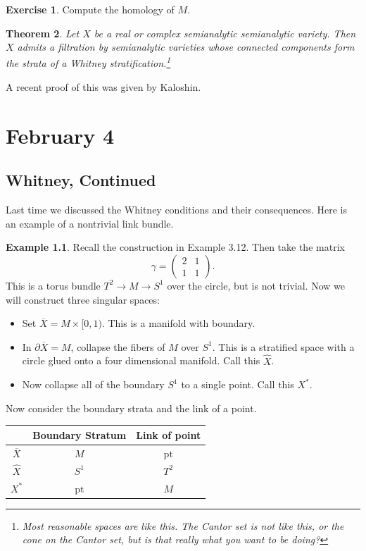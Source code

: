 \documentclass[leqno, openany]{memoir}
\newtheorem{thm}{Theorem}[chapter]
\theoremstyle{definition}
\newtheorem{exm}[thm]{Example}
\newtheorem{exer}[thm]{Exercise}
\theoremstyle{remark}
\theoremstyle{plain}
\theoremstyle{definition}
\theoremstyle{remark}
\newcommand{\mr}[1]{\mathrm{#1}}
\begin{document}
\begin{exer} Compute the homology of $M$.  \end{exer}

\begin{thm} Let $X$ be a real or complex semianalytic semianalytic variety.
    Then $X$ admits a filtration by semianalytic varieties whose connected
    components form the strata of a Whitney stratification.\footnote{Most
    reasonable spaces are like this. The Cantor set is not like this, or the
cone on the Cantor set, but is that really what you want to be doing?}
\end{thm} A recent proof of this was given by Kaloshin.

\chapter{February 4}%

\section{Whitney, Continued}%

Last time we discussed the Whitney conditions and their consequences. Here is
an example of a nontrivial link bundle. 

\begin{exm} Recall the construction in Example 3.12. Then take the matrix \[
    \gamma = \begin{pmatrix} 2 & 1 \\ 1 & 1 \end{pmatrix}. \] This is a torus
    bundle $T^2 \to M \to S^1$ over the circle, but is not trivial. Now we will
    construct three singular spaces: \begin{itemize} \item Set $\overline{X} =
        M \times [0,1)$. This is a manifold with boundary.  \item In $\partial
        \overline{X} = M$, collapse the fibers of $M$ over $S^1$. This is a
        stratified space with a circle glued onto a four dimensional manifold.
        Call this $\widehat{X}$.  \item Now collapse all of the boundary $S^1$
    to a single point. Call this $X^*$.  \end{itemize} Now consider the
    boundary strata and the link of a point.  \begin{center}
        \begin{tabular}{ccc} \toprule & Boundary Stratum & Link of point \\
        \midrule $\overline{X}$ & $M$ & $\mr{pt}$ \\ $\widehat{X}$ & $S^1$ &
    $T^2$ \\ $X^*$ & $\mr{pt}$ & $M$ \\ \bottomrule \end{tabular} \end{center}
        \end{exm}
\end{document}
